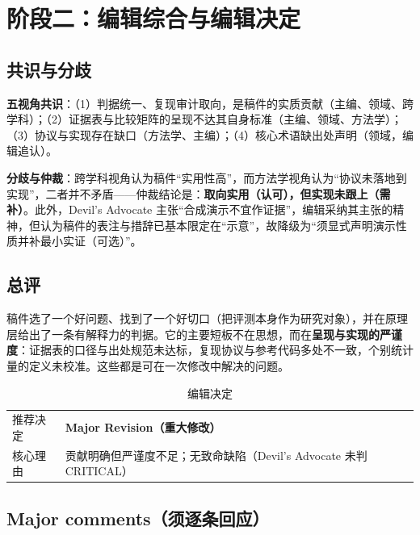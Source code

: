 \documentclass[11pt,a4paper]{ctexart}
\begin{document}
\section{阶段二：编辑综合与编辑决定}

\subsection{共识与分歧}

\textbf{五视角共识}：（1）判据统一、复现审计取向，是稿件的实质贡献（主编、领域、跨学科）；（2）证据表与比较矩阵的呈现不达其自身标准（主编、领域、方法学）；（3）协议与实现存在缺口（方法学、主编）；（4）核心术语缺出处声明（领域，编辑追认）。

\textbf{分歧与仲裁}：跨学科视角认为稿件“实用性高”，而方法学视角认为“协议未落地到实现”，二者并不矛盾——仲裁结论是：\textbf{取向实用（认可），但实现未跟上（需补）}。此外，Devil's Advocate 主张“合成演示不宜作证据”，编辑采纳其主张的精神，但认为稿件的表注与措辞已基本限定在“示意”，故降级为“须显式声明演示性质并补最小实证（可选）”。

\subsection{总评}

稿件选了一个好问题、找到了一个好切口（把评测本身作为研究对象），并在原理层给出了一条有解释力的判据。它的主要短板不在思想，而在\textbf{呈现与实现的严谨度}：证据表的口径与出处规范未达标，复现协议与参考代码多处不一致，个别统计量的定义未校准。这些都是可在一次修改中解决的问题。

\begin{table}[htbp]
\centering
\caption{编辑决定}
\begin{tabular}{@{}>{\raggedright\arraybackslash}p{3.4cm}>{\raggedright\arraybackslash}p{11.0cm}@{}}
\toprule
推荐决定 & \textbf{Major Revision（重大修改）} \\
核心理由 & 贡献明确但严谨度不足；无致命缺陷（Devil's Advocate 未判 CRITICAL） \\
\bottomrule
\end{tabular}
\end{table}

\subsection{Major comments（须逐条回应）}
\end{document}
